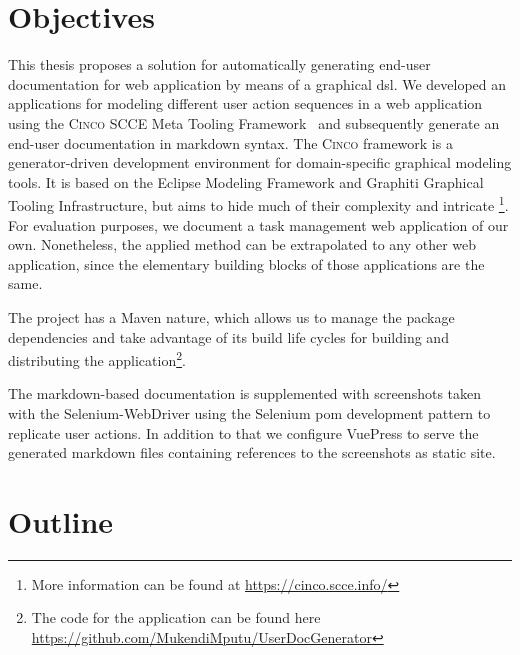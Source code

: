 \section{Objectives}\label{sec:objectives}

This thesis proposes a solution for automatically generating end-user documentation for web application by means of a graphical \acrfull{dsl}. We developed an applications for modeling different user action sequences in a web application using the \textsc{Cinco} SCCE Meta Tooling Framework~\cite{Cinco} and subsequently generate an end-user documentation in markdown syntax. The \textsc{Cinco} framework is a generator-driven development environment for domain-specific graphical modeling tools. It is based on the Eclipse Modeling Framework and Graphiti Graphical Tooling Infrastructure, but aims to hide much of their complexity and intricate \footnote{More information can be found at \url{https://cinco.scce.info/}}. For evaluation purposes, we document a task management web application of our own. Nonetheless, the applied method can be extrapolated to any other web application, since the elementary building blocks of those applications are the same.

The project has a Maven nature, which allows us to manage the package dependencies and take advantage of its build life cycles for building and distributing the application\footnote{The code for the application can be found here \url{https://github.com/MukendiMputu/UserDocGenerator}}.

The markdown-based documentation is supplemented with screenshots taken with the Selenium-WebDriver using the \gls{Selenium} \acrfull{pom} development pattern to replicate user actions. In addition to that we configure \gls{VuePress} to serve the generated markdown files containing references to the screenshots as static site.

\section{Outline}\label{sec:outline}


